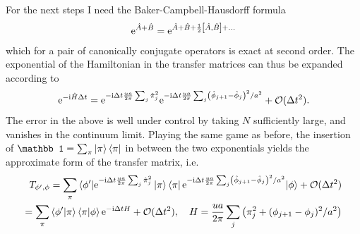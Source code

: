 For the next steps I need the Baker-Campbell-Hausdorff formula
\begin{align}
    \mathrm e^{\hat A+\hat B} = \mathrm e^{\hat A + \hat B + \frac12\left[ \hat A, \hat B \right]+\dots}
\end{align}
which for a pair of canonically conjugate operators is exact at second order.
The exponential of the Hamiltonian in the transfer matrices can thus be expanded according to
\begin{align}
    \mathrm e^{-\mathrm i\hat H\Delta t} = \mathrm e^{-\mathrm i\Delta t\frac{ua}{2\pi}\sum_{j}\hat\pi_j^2}\mathrm e^{-\mathrm i\Delta t\frac{ua}{2\pi}\sum_{j}\left( \hat\phi_{j+1}-\hat\phi_j \right)^2/a^2}+\mathcal O(\Delta t^2).
\end{align}
The error in the above is well under control by taking $N$ sufficiently large, and vanishes in the continuum limit.
Playing the same game as before, the insertion of $\mathbb1=\sum_\pi\ket{\pi}\bra{\pi}$ in between the two exponentials yields the approximate form of the transfer matrix, i.e.
\begin{align}
    T_{\phi',\phi} = \sum_\pi\braket{\phi'|\mathrm e^{-\mathrm i\Delta t\frac{ua}{2\pi}\sum_{j}\hat\pi_j^2}\ket{\pi}\bra{\pi}\mathrm e^{-\mathrm i\Delta t\frac{ua}{2\pi}\sum_{j}\left( \hat\phi_{j+1}-\hat\phi_j \right)^2/a^2}|\phi} + \mathcal O(\Delta t^2)
    \\
    =
    \sum_\pi\braket{\phi'|\pi}\braket{\pi|\phi}\mathrm e^{-\mathrm i\Delta t H} + \mathcal O(\Delta t^2)
    ,\quad
    H = \frac{ua}{2\pi}\sum_{j}\left( \pi_{j}^2+(\phi_{j+1}-\phi_{j})^2/a^2 \right)
\end{align}

